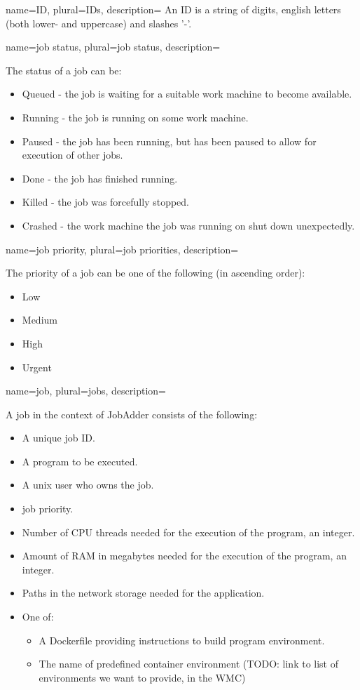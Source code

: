 {
  name=ID,
  plural=IDs,
  description={
    An ID is a string of digits, english letters (both lower- and uppercase) and slashes '-'.
  }
}
{
  name=job status,
  plural=job status,
  description={
    The status of a job can be:
    \begin{itemize}
      \item Queued - the job is waiting for a suitable work machine to become available.
      \item Running - the job is running on some work machine.
      \item Paused - the job has been running, but has been paused to allow for execution of other jobs.
      \item Done - the job has finished running.
      \item Killed - the job was forcefully stopped.
      \item Crashed - the work machine the job was running on shut down unexpectedly.
    \end{itemize}
  }
}
{
  name=job priority,
  plural=job priorities,
  description={
    The priority of a job can be one of the following (in ascending order):
    \begin{itemize}
      \item Low
      \item Medium
      \item High
      \item Urgent
    \end{itemize}
  }
}
{
  name=job,
  plural=jobs,
  description={
      A job in the context of JobAdder consists of the following:
      \begin{itemize}
        \item A unique job \gls{ID}.
        \item A program to be executed.
        \item A unix user who owns the job.
        \item \Gls{job priority}.
        \item Number of CPU threads needed for the execution of the program, an integer.
        \item Amount of RAM in megabytes needed for the execution of the program, an integer.
        \item Paths in the network storage needed for the application.
        \item One of:
        \begin{itemize}
          \item A Dockerfile providing instructions to build program environment.
          \item The name of predefined container environment (TODO: link to list of environments we want to provide, in the WMC)
        \end{itemize}
     \end{itemize}
  }
}

